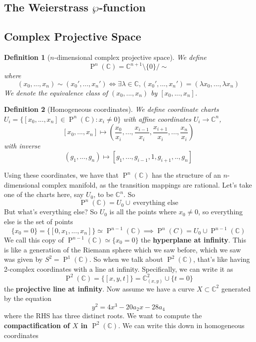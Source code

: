 \documentclass{article}
\newcommand{\mbb}[1]{\mathbb{#1}}
\newtheorem{definition}{Definition}
\DeclareMathOperator{\BigP}{P}
\newcommand{\Prj}[2]{\BigP^{#1}({#2})}
\begin{document}
\subsection{The Weierstrass \(\wp\)-function}

\subsection{Complex Projective Space}

\begin{definition}[\(n\)-dimensional complex projective space]
We define
\[\Prj{n}{\mbb{C}} = \mbb{C}^{n + 1} \setminus \{0\} / \sim\]
where
\[(x_0,...,x_n) \sim (x_0',...,x_n') \iff \exists \lambda \in \mbb{C}, (x_0',...,x_n') = (\lambda x_0,..., \lambda x_n)\]
We denote the equivalence class of \((x_0,...,x_n)\) by \([x_0,...,x_n]\).
\end{definition}
\begin{definition}[Homogeneous coordinates]
We define coordinate charts \(U_i = \{[x_0, ..., x_n] \in \Prj{n}{\mbb{C}} : x_i \neq 0\}\) with affine coordinates \(U_i \to \mbb{C}^n\),
\[[x_0,...,x_n] \mapsto \left(\frac{x_0}{x_i},...,\frac{x_{i - 1}}{x_i}, \frac{x_{i + 1}}{x_i},...,\frac{x_n}{x_i}\right)\]
with inverse
\[(g_1,...,g_n) \mapsto [g_1,...,g_{i - 1}, 1, g_{i + 1},..,g_n]\]
\end{definition}
Using these coordinates, we have that \(\Prj{n}{\mbb{C}}\) has the structure of an \(n\)-dimensional complex manifold, as the transition mappings are rational. Let's take one of the charts here, say \(U_0\), to be \(\mbb{C}^n\). So
\[\Prj{n}{\mbb{C}} = U_0 \cup \ \text{everything else}\]
But what's everything else? So \(U_0\) is all the points where \(x_0 \neq 0\), so everything else is the set of points
\[\{x_0 = 0\} = \{[0, x_1,...,x_n]\} \simeq \Prj{n - 1}{\mbb{C}} \implies \Prj{n}{C} = U_0 \cup \Prj{n - 1}{\mbb{C}}\]
We call this copy of \(\Prj{n - 1}{\mbb{C}} \simeq \{x_0 = 0\}\) the \textbf{hyperplane at infinity}. This is like a generation of the Riemann sphere which we saw before, which we saw was given by \(S^2 = \Prj{1}{\mbb{C}}\). So when we talk about \(\Prj{2}{\mbb{C}}\), that's like having 2-complex coordinates with a line at infinity. Specifically, we can write it as
\[\Prj{2}{\mbb{C}} = \{[x, y, t]\} = \mbb{C}^2_{(x, y)} \cup \{t = 0\}\]
the \textbf{projective line at infinity}.
Now assume we have a curve \(X \subset \mbb{C}^2\) generated by the equation
\[y^2 = 4x^3 - 20a_2x - 28a_4\]
where the RHS has three distinct roots. We want to compute the \textbf{compactification of \(X\) in \(\Prj{2}{\mbb{C}}\)}. We can write this down in homogeneous coordinates
\end{document}
